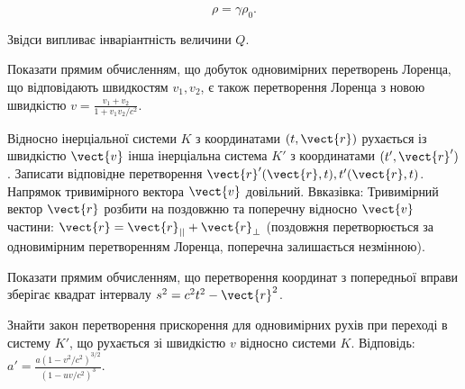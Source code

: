 \begin{equation}\label{eq:charge_density_transform}
    \rho = \gamma \rho_0.
\end{equation}

Звідси випливає інваріантність величини $Q$.


\begin{problem}
Показати прямим обчисленням, що добуток одновимірних перетворень Лоренца, що відповідають швидкостям $v_1, v_2$, є також перетворення Лоренца з новою швидкістю $v = \frac{v_1+v_2}{1+v_1 v_2/c^2}$.
\end{problem}

\begin{problem}
Відносно інерціальної системи $K$ з координатами $(t, \vect{r})$ рухається із швидкістю $\vect{v}$ інша інерціальна система $K'$ з координатами $(t', \vect{r}')$. Записати відповідне перетворення $\vect{r}'(\vect{r}, t), t'(\vect{r}, t)$. Напрямок тривимірного вектора $\vect{v}$ довільний.
Ввказівка: Тривимірний вектор $\vect{r}$ розбити на поздовжню та поперечну відносно $\vect{v}$ частини: $\vect{r} = \vect{r}_{||} + \vect{r}_{\perp}$ (поздовжня перетворюється за одновимірним перетворенням Лоренца, поперечна залишається незмінною).
\end{problem}

\begin{problem}
Показати прямим обчисленням, що перетворення координат з попередньої вправи зберігає квадрат інтервалу $s^2 = c^2t^2 - \vect{r}^2$.
\end{problem}

\begin{problem}
Знайти закон перетворення прискорення для одновимірних рухів при переході в систему $K'$, що рухається зі швидкістю $v$ відносно системи $K$.
Відповідь: $a' = \frac{a(1-v^2/c^2)^{3/2}}{(1-uv/c^2)^3}$.
\end{problem}

